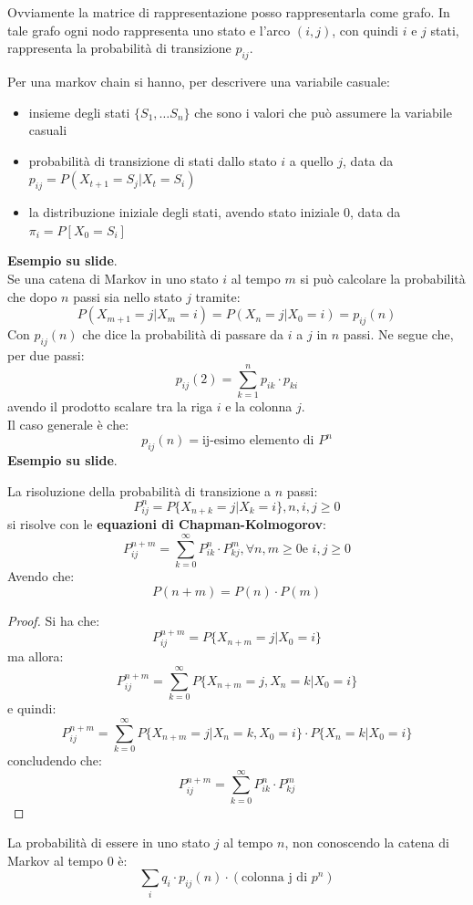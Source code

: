 \message{ !name(modprob.tex)}\documentclass[a4paper,12pt, oneside]{book}
\begin{document}
Ovviamente la matrice di rappresentazione posso rappresentarla come grafo.
In tale grafo ogni nodo rappresenta uno
stato e l'arco $(i,j)$, con quindi $i$ e $j$ stati, rappresenta la probabilità
di transizione $p_{ij}$.
\begin{definizione}
  Per una markov chain si hanno, per descrivere una variabile casuale:
  \begin{itemize}
    \item insieme degli stati $\{S_1,\ldots S_n\}$ che sono i valori che può
    assumere la variabile casuali
    \item probabilità di transizione di stati dallo stato $i$ a quello $j$, data
    da $p_{ij}=P(X_{t+1}=S_j|X_t=S_i)$
    \item la distribuzione iniziale degli stati, avendo stato iniziale $0$, data
    da $\pi_i=P[X_0=S_i]$ 
  \end{itemize}
\end{definizione}
\textbf{Esempio su slide}.\\
Se una catena di Markov in uno stato $i$ al tempo $m$ si può calcolare la
probabilità che dopo $n$ passi sia nello stato $j$ tramite:
\[P(X_{m+1}=j|X_m=i)=P(X_n=j|X_0=i)=p_{ij}(n)\]
Con $p_{ij}(n)$ che dice la probabilità di passare da $i$ a $j$ in $n$ passi. Ne
segue che, per due passi:
\[p_{ij}(2)=\sum_{k=1}^n p_{ik}\cdot p_{ki}\]
avendo il prodotto scalare tra la riga $i$ e la colonna $j$.\\
Il caso generale è che:
\[p_{ij}(n)=\mbox{ij-esimo elemento di } P^n\]
\textbf{Esempio su slide}.\\
\begin{teorema}
  La risoluzione della probabilità di transizione a $n$ passi:
  \[P_{ij}^n=P\{X_{n+k}=j|X_k=i\},n,i,j\geq 0\]
  si risolve con le \textbf{equazioni di Chapman-Kolmogorov}:
  \[P_{ij}^{n+m}=\sum_{k=0}^\infty P_{ik}^n\cdot P_{kj}^m,\forall n,m\geq 0\mbox{
      e } i,j\geq 0\]
  Avendo che:
  \[P(n+m)=P(n)\cdot P(m)\]
\end{teorema}
\begin{proof}
  Si ha che:
  \[P_{ij}^{n+m}=P\{X_{n+m}=j|X_0=i\}\]
  ma allora:
  \[P_{ij}^{n+m}=\sum_{k=0}^\infty P\{X_{n+m}=j,X_n=k|X_0=i\}\]
  e quindi:
  \[P_{ij}^{n+m}=\sum_{k=0}^\infty P\{X_{n+m}=j|X_n=k,X_0=i\}\cdot
    P\{X_n=k|X_0=i\}\]
  concludendo che:
  \[P_{ij}^{n+m}=\sum_{k=0}^\infty P_{ik}^n\cdot P_{kj}^m\]
\end{proof}
\begin{teorema}
  La probabilità di essere in uno stato $j$ al tempo $n$, non conoscendo la
  catena di Markov al tempo 0 è:
  \[\sum_i q_i\cdot p_{ij}(n)\cdot(\mbox{colonna j di }p^n)\]
\end{teorema}
\end{document}
